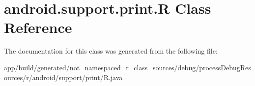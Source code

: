 \hypertarget{classandroid_1_1support_1_1print_1_1_r}{}\section{android.\+support.\+print.\+R Class Reference}
\label{classandroid_1_1support_1_1print_1_1_r}


The documentation for this class was generated from the following file\+:\begin{DoxyCompactItemize}
\item 
app/build/generated/not\+\_\+namespaced\+\_\+r\+\_\+class\+\_\+sources/debug/process\+Debug\+Resources/r/android/support/print/R.\+java\end{DoxyCompactItemize}
